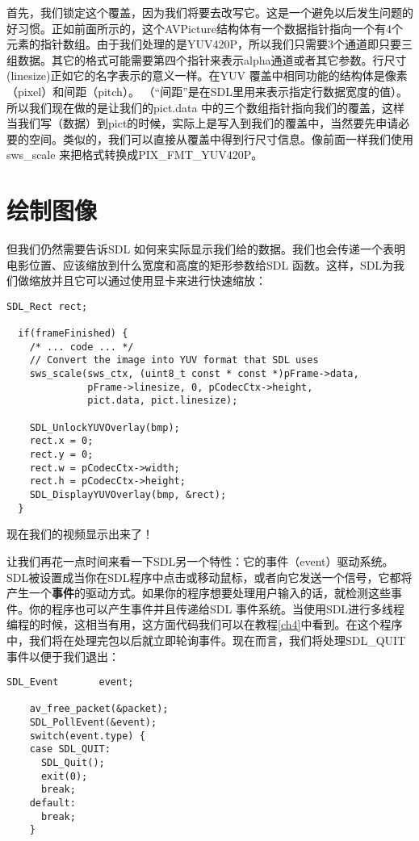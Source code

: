 首先，我们锁定这个覆盖，因为我们将要去改写它。这是一个避免以后发生问题的好习惯。正如前面所示的，这个AVPicture结构体有一个数据指针指向一个有4个元素的指针数组。由于我们处理的是YUV420P，所以我们只需要3个通道即只要三组数据。其它的格式可能需要第四个指针来表示alpha通道或者其它参数。行尺寸(linesize)正如它的名字表示的意义一样。在YUV 覆盖中相同功能的结构体是像素（pixel）和间距（pitch）。 （“间距”是在SDL里用来表示指定行数据宽度的值）。所以我们现在做的是让我们的pict.data 中的三个数组指针指向我们的覆盖，这样当我们写（数据）到pict的时候，实际上是写入到我们的覆盖中，当然要先申请必要的空间。类似的，我们可以直接从覆盖中得到行尺寸信息。像前面一样我们使用sws_scale 来把格式转换成PIX_FMT_YUV420P。

\section{绘制图像}

但我们仍然需要告诉SDL 如何来实际显示我们给的数据。我们也会传递一个表明电影位置、应该缩放到什么宽度和高度的矩形参数给SDL 函数。这样，SDL为我们做缩放并且它可以通过使用显卡来进行快速缩放：

\begin{lstlisting}
SDL_Rect rect;

  if(frameFinished) {
    /* ... code ... */
    // Convert the image into YUV format that SDL uses
	sws_scale(sws_ctx, (uint8_t const * const *)pFrame->data,
			  pFrame->linesize, 0, pCodecCtx->height,
			  pict.data, pict.linesize);

    SDL_UnlockYUVOverlay(bmp);
    rect.x = 0;
    rect.y = 0;
    rect.w = pCodecCtx->width;
    rect.h = pCodecCtx->height;
    SDL_DisplayYUVOverlay(bmp, &rect);
  }
\end{lstlisting}

现在我们的视频显示出来了！

让我们再花一点时间来看一下SDL另一个特性：它的事件（event）驱动系统。SDL被设置成当你在SDL程序中点击或移动鼠标，或者向它发送一个信号，它都将产生一个\textbf{事件}的驱动方式。如果你的程序想要处理用户输入的话，就检测这些事件。你的程序也可以产生事件并且传递给SDL 事件系统。当使用SDL进行多线程编程的时候，这相当有用，这方面代码我们可以在教程\ref{ch4}中看到。在这个程序中，我们将在处理完包以后就立即轮询事件。现在而言，我们将处理SDL_QUIT事件以便于我们退出：

\begin{lstlisting}
SDL_Event       event;

    av_free_packet(&packet);
    SDL_PollEvent(&event);
    switch(event.type) {
    case SDL_QUIT:
      SDL_Quit();
      exit(0);
      break;
    default:
      break;
    }
\end{lstlisting}

